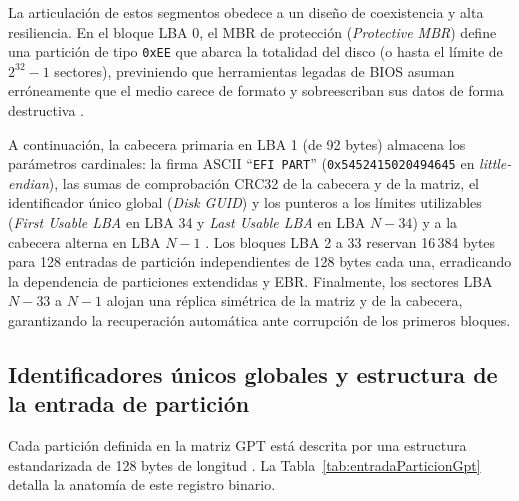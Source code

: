 \documentclass[12pt]{article}
\begin{document}
La articulación de estos segmentos obedece a un diseño de coexistencia y alta resiliencia. En el bloque LBA 0, el MBR de protección (\textit{Protective MBR}) define una partición de tipo \texttt{0xEE} que abarca la totalidad del disco (o hasta el límite de $2^{32}-1$ sectores), previniendo que herramientas legadas de BIOS asuman erróneamente que el medio carece de formato y sobreescriban sus datos de forma destructiva \parencite[\S 5.2.2, p.\ 112]{uefi2024specification}.

A continuación, la cabecera primaria en LBA 1 (de 92 bytes) almacena los parámetros cardinales: la firma ASCII \enquote{\texttt{EFI PART}} (\texttt{0x5452415020494645} en \textit{little-endian}), las sumas de comprobación CRC32 de la cabecera y de la matriz, el identificador único global (\textit{Disk GUID}) y los punteros a los límites utilizables (\textit{First Usable LBA} en LBA 34 y \textit{Last Usable LBA} en LBA $N-34$) y a la cabecera alterna en LBA $N-1$ \parencite[\S 5.3.1, pp.\ 113--115]{uefi2024specification}. Los bloques LBA 2 a 33 reservan 16\,384 bytes para 128 entradas de partición independientes de 128 bytes cada una, erradicando la dependencia de particiones extendidas y EBR. Finalmente, los sectores LBA $N-33$ a $N-1$ alojan una réplica simétrica de la matriz y de la cabecera, garantizando la recuperación automática ante corrupción de los primeros bloques.

\subsection{Identificadores únicos globales y estructura de la entrada de partición}
\label{subsec:identificadoresEntradaGpt}

Cada partición definida en la matriz GPT está descrita por una estructura estandarizada de 128 bytes de longitud \parencite[\S 5.3.3, pp.\ 118--120]{uefi2024specification}. La Tabla~\ref{tab:entradaParticionGpt} detalla la anatomía de este registro binario.
\end{document}
